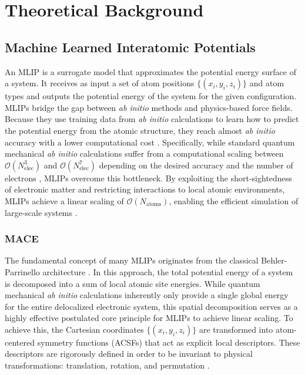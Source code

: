 \chapter{Theoretical Background}\label{ch: ch2}%

\section{Machine Learned Interatomic Potentials}
An MLIP is a surrogate model that approximates the potential energy surface of a system.
It receives as input a set of atom positions $\{(x_i,y_i,z_i)\}$ and atom types and outputs the potential energy of the system for the given configuration.
MLIPs bridge the gap between \textit{ab initio} methods and physics-based force fields.
Because they use training data from \textit{ab initio} calculations to learn how to predict the potential energy from the atomic structure, they reach almost \textit{ab initio} accuracy with a lower computational cost \cite{Jacobs2025}. 
Specifically, while standard quantum mechanical \textit{ab initio} calculations suffer from a computational scaling between $\mathcal{O}(N_{\text{elec}}^3)$ and $\mathcal{O}(N_{\text{elec}}^7)$ depending on the desired accuracy and the number of electrons \cite{Anstine2023}, MLIPs overcome this bottleneck. 
By exploiting the short-sightedness of electronic matter and restricting interactions to local atomic environments, MLIPs achieve a linear scaling of $\mathcal{O}(N_{\text{atoms}})$, enabling the efficient simulation of large-scale systems \cite{Schaefer2025} \cite{Anstine2023}.

\subsection{MACE}
The fundamental concept of many MLIPs originates from the classical Behler-Parrinello architecture \cite{Behler2007}. 
In this approach, the total potential energy of a system is decomposed into a sum of local atomic site energies. 
While quantum mechanical \textit{ab initio} calculations inherently only provide a single global energy for the entire delocalized electronic system, this spatial decomposition serves as a highly effective postulated core principle for MLIPs to achieve linear scaling.
To achieve this, the Cartesian coordinates $\{(x_i, y_i, z_i)\}$ are transformed into atom-centered symmetry functions (ACSFs) that act as explicit local descriptors. 
These descriptors are rigorously defined in order to be invariant to physical transformations: translation, rotation, and permutation \cite{Behler2007, Jacobs2025}.

